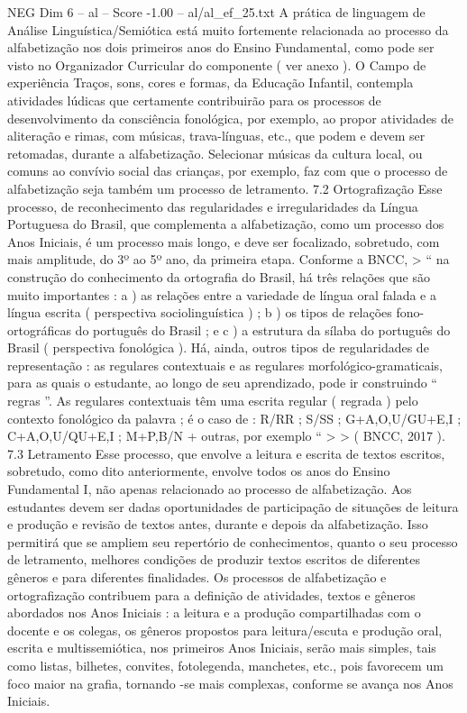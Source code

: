 \begin{textsample}{NEG Dim 6 – al – Score -1.00 – al/al\_ef\_25.txt}
A prática de linguagem de Análise Linguística/Semiótica está muito fortemente relacionada ao processo da alfabetização nos dois primeiros anos do Ensino Fundamental, como pode ser visto no Organizador Curricular do componente ( ver anexo ).
O Campo de experiência Traços, sons, cores e formas, da Educação Infantil, contempla atividades lúdicas que certamente contribuirão para os processos de desenvolvimento da consciência fonológica, por exemplo, ao propor atividades de aliteração e rimas, com músicas, trava-línguas, etc., que podem e devem ser retomadas, durante a alfabetização.
Selecionar músicas da cultura local, ou comuns ao convívio social das crianças, por exemplo, faz com que o processo de alfabetização seja também um processo de letramento. 7.2 Ortografização Esse processo, de reconhecimento das regularidades e irregularidades da Língua Portuguesa do Brasil, que complementa a alfabetização, como um processo dos Anos Iniciais, é um processo mais longo, e deve ser focalizado, sobretudo, com mais amplitude, do 3º ao 5º ano, da primeira etapa.
Conforme a BNCC, > “ na construção do conhecimento da ortografia do Brasil, há três relações que são muito importantes : a ) as relações entre a variedade de língua oral falada e a língua escrita ( perspectiva sociolinguística ) ; b ) os tipos de relações fono-ortográficas do português do Brasil ; e c ) a estrutura da sílaba do português do Brasil ( perspectiva fonológica ).
Há, ainda, outros tipos de regularidades de representação : as regulares contextuais e as regulares morfológico-gramaticais, para as quais o estudante, ao longo de seu aprendizado, pode ir construindo “ regras ”.
As regulares contextuais têm uma escrita regular ( regrada ) pelo contexto fonológico da palavra ; é o caso de : R/RR ; S/SS ; G+A,O,U/GU+E,I ; C+A,O,U/QU+E,I ; M+P,B/N + outras, por exemplo “ > > ( BNCC, 2017 ). 7.3 Letramento Esse processo, que envolve a leitura e escrita de textos escritos, sobretudo, como dito anteriormente, envolve todos os anos do Ensino Fundamental I, não apenas relacionado ao processo de alfabetização.
Aos estudantes devem ser dadas oportunidades de participação de situações de leitura e produção e revisão de textos antes, durante e depois da alfabetização.
Isso permitirá que se ampliem seu repertório de conhecimentos, quanto o seu processo de letramento, melhores condições de produzir textos escritos de diferentes gêneros e para diferentes finalidades.
Os processos de alfabetização e ortografização contribuem para a definição de atividades, textos e gêneros abordados nos Anos Iniciais : a leitura e a produção compartilhadas com o docente e os colegas, os gêneros propostos para leitura/escuta e produção oral, escrita e multissemiótica, nos primeiros Anos Iniciais, serão mais simples, tais como listas, bilhetes, convites, fotolegenda, manchetes, etc., pois favorecem um foco maior na grafia, tornando -se mais complexas, conforme se avança nos Anos Iniciais.

\end{textsample}
